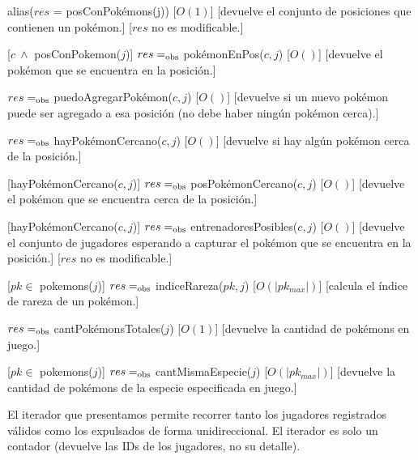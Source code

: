 \begin{Interfaz}
	{alias($res$ = posConPokémons(j))}
	[$O(1)$]
	[devuelve el conjunto de posiciones que contienen un pokémon.]
	[$res$ no es modificable.]

	[$c \ \land$ posConPokemon($j$)]
	{$res =_{\mathrm{obs}}$ pokémonEnPos($c,j$)}
	[$O()$]
	[devuelve el pokémon que se encuentra en la posición.]

	{$res =_{\mathrm{obs}}$ puedoAgregarPokémon($c,j$)}
	[$O()$]
	[devuelve si un nuevo pokémon puede ser agregado a esa posición (no debe haber ningún pokémon cerca).]

	{$res =_{\mathrm{obs}}$ hayPokémonCercano($c,j$)}
	[$O()$]
	[devuelve si hay algún pokémon cerca de la posición.]

	[hayPokémonCercano($c,j$)]
	{$res =_{\mathrm{obs}}$ posPokémonCercano($c,j$)}
	[$O()$]
	[devuelve el pokémon que se encuentra cerca de la posición.]

	[hayPokémonCercano($c,j$)]
	{$res =_{\mathrm{obs}}$ entrenadoresPosibles($c,j$)}
	[$O()$]
	[devuelve el conjunto de jugadores esperando a capturar el pokémon que se encuentra en la posición.]
	[$res$ no es modificable.]

	[$pk \in$ pokemons($j$)]
	{$res =_{\mathrm{obs}}$ indiceRareza($pk,j$)}
	[$O(|pk_{max}|)$]
	[calcula el índice de rareza de un pokémon.]

	{$res =_{\mathrm{obs}}$ cantPokémonsTotales($j$)}
	[$O(1)$]
	[devuelve la cantidad de pokémons en juego.]

	[$pk \in$ pokemons($j$)]
	{$res =_{\mathrm{obs}}$ cantMismaEspecie($j$)}
	[$O(|pk_{max}|)$]
	[devuelve la cantidad de pokémons de la especie especificada en juego.]


	El iterador que presentamos permite recorrer tanto los jugadores registrados válidos como los expulsados de forma unidireccional. El iterador es solo un contador (devuelve las IDs de los jugadores, no su detalle).



\end{Interfaz}

